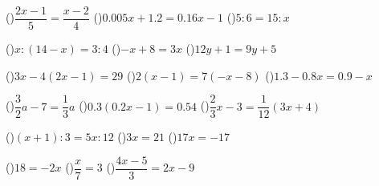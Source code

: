 \documentclass[
  12pt,a4paper,lualatex,ja=standard]{bxjsarticle}
\begin{document}
\begin{flushleft}
\vfill

()\hspace{2.5pt}$\dfrac{2x - 1}{5} = \dfrac{x - 2}{4}$ \hfill ()\hspace{2.5pt}$0.005x + 1.2 = 0.16x - 1$ \hfill ()\hspace{2.5pt}$5 : 6 = 15 : x$ 

\vfill

\newpage

()\hspace{2.5pt}$x : (14 -x) = 3 : 4$ \hfill ()\hspace{2.5pt}$-x + 8 = 3x$ \hfill ()\hspace{2.5pt}$12y + 1 = 9y + 5$

\vfill

()\hspace{2.5pt}$3x - 4(2x - 1) = 29$ \hfill ()\hspace{2.5pt}$2(x - 1) = 7(- x - 8)$ \hfill ()\hspace{2.5pt}$1.3 - 0.8x = 0.9 - x$ 

\vfill

()\hspace{2.5pt}$\dfrac{3}{2}a - 7 = \dfrac{1}{3}a$ \hfill ()\hspace{2.5pt}$0.3(0.2x - 1) = 0.54$ \hfill ()\hspace{2.5pt}$\dfrac{2}{3}x -3 = \dfrac{1}{12}(3x + 4)$

\vfill

()\hspace{2.5pt}$(x + 1):3 = 5x :12$ \hfill ()\hspace{2.5pt}$3x = 21$ \hfill ()\hspace{2.5pt}$17x = -17$ 

\vfill

()\hspace{2.5pt}$18 = -2x$ \hfill ()\hspace{2.5pt}$\dfrac{x}{7} = 3$ \hfill ()\hspace{2.5pt}$\dfrac{4x -5}{3} = 2x - 9$


\end{flushleft}
\end{document}
